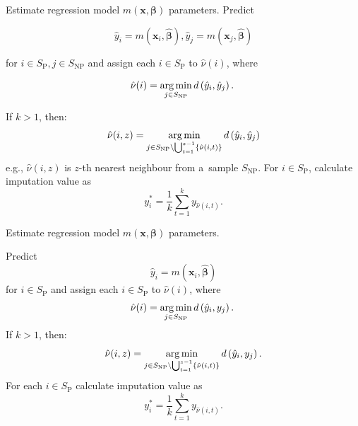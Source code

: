 \documentclass[nojss]{jss}
\begin{document}
\begin{algorithm}[ht!]
\caption{Mass imputation using predictive mean matching variant: $\hat{y}-\hat{y}$ matching}
\label{algo-3}
\begin{algorithmic}[1]
\State Estimate regression model $m(\boldsymbol{x}, \boldsymbol{\beta})$ parameters.\;
\State Predict 

$$\hat{y}_{i}=m\left(\boldsymbol{x}_{i},\hat{\boldsymbol{\beta}}\right),  \hat{y}_{j}=m\left(\boldsymbol{x}_{j},\hat{\boldsymbol{\beta}}\right)$$

for $i\in S_{\text{P}}, j\in S_{\text{NP}}$ and assign each  $i\in S_{\text{P}}$ to $\hat{\nu}(i)$, where

$$
\hat{\nu}(i)=
\operatornamewithlimits{arg\,min}_{j\in S_{\text{NP}}}d\left(\hat{y}_{i},\hat{y}_{j}\right).\;
$$ 

\State If $k>1$, then:
$$
\hat{\nu}(i, z) = \operatornamewithlimits{arg\,min}_{ j\in S_{\text{NP}}\setminus\bigcup_{t=1}^{z-1}
\{\hat{\nu}(i, t)\}} d\left(\hat{y}_{i},\hat{y}_{j}\right)
$$
e.g., $\hat{\nu}(i, z)$ is $z$-th nearest neighbour from a~sample $S_{\text{NP}}$.\;
\State For $i \in S_{\text{P}}$, calculate imputation value as 
$$
y_i^* = \frac{1}{k}\sum_{t=1}^{k}y_{\hat{\nu}(i, t)}.
$$
\end{algorithmic}
\end{algorithm}

\begin{algorithm}[ht!]
\caption{Mass imputation using predictive mean matching variant: $\hat{y}-y$ matching}
\label{algo-4}
\begin{algorithmic}[1]

\State Estimate regression model $m(\boldsymbol{x}, \boldsymbol{\beta})$ parameters.\;

\State Predict 
$$
\hat{y}_{i}=m\left(\boldsymbol{x}_{i},\hat{\boldsymbol{\beta}}\right)
$$  for $i \in S_{\text{P}}$ 
and assign each  $i \in S_{\text{P}}$ to $\hat{\nu}(i)$, where
$$
\hat{\nu}(i)=
\operatornamewithlimits{arg\,min}_{j \in S_{\text{NP}}}d\left(\hat{y}_{i},y_{j}\right).\;
$$
\State If $k>1$, then:
$$
\hat{\nu}(i, z) = \operatornamewithlimits{arg\,min}_{j \in S_{\text{NP}} \setminus \bigcup_{t=1}^{z-1}
\{\hat{\nu}(i, t)\}} d\left(\hat{y}_{i},y_{j}\right).
$$
\State For each $i \in S_{\text{P}}$ calculate imputation value as
$$
y_i^* = \frac{1}{k}\sum_{t=1}^{k}y_{\hat{\nu}(i, t)}.
$$
\end{algorithmic}
\end{algorithm}

\clearpage
\end{document}
